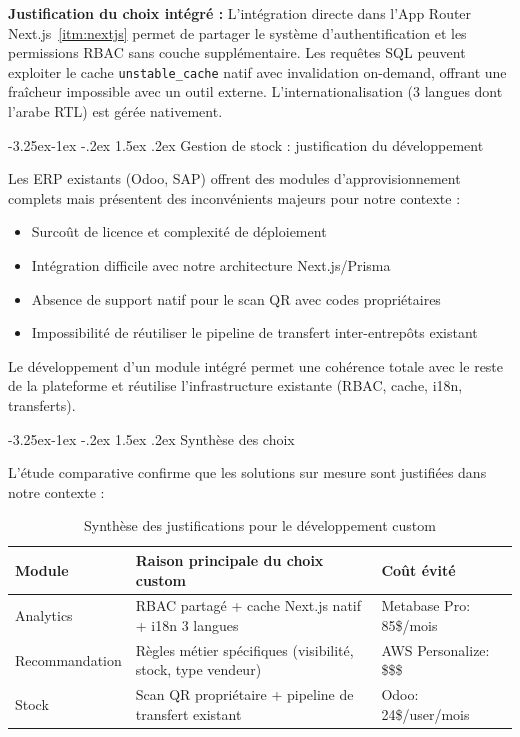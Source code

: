 \documentclass[12pt,a4paper,openany]{report}
\makeatletter
\renewcommand\subsection{\@startsection{subsection}{2}{\z@}%
  {-3.25ex\@plus -1ex \@minus -.2ex}%
  {1.5ex \@plus .2ex}%
  {\needspace{8\baselineskip}\normalfont\large\bfseries\color{primary!80!black}}}
\newcommand{\code}[1]{\texttt{#1}}
\makeatother
\begin{document}
\textbf{Justification du choix intégré :} L'intégration directe dans l'App Router Next.js~\ref{itm:nextjs} permet de partager le système d'authentification et les permissions RBAC sans couche supplémentaire. Les requêtes SQL peuvent exploiter le cache \code{unstable\_cache} natif avec invalidation on-demand, offrant une fraîcheur impossible avec un outil externe. L'internationalisation (3 langues dont l'arabe RTL) est gérée nativement.

\subsection{Gestion de stock : justification du développement}

Les ERP existants (Odoo, SAP) offrent des modules d'approvisionnement complets mais présentent des inconvénients majeurs pour notre contexte :
\begin{itemize}
  \item Surcoût de licence et complexité de déploiement
  \item Intégration difficile avec notre architecture Next.js/Prisma
  \item Absence de support natif pour le scan QR avec codes propriétaires
  \item Impossibilité de réutiliser le pipeline de transfert inter-entrepôts existant
\end{itemize}

Le développement d'un module intégré permet une cohérence totale avec le reste de la plateforme et réutilise l'infrastructure existante (RBAC, cache, i18n, transferts).

\subsection{Synthèse des choix}

L'étude comparative confirme que les solutions sur mesure sont justifiées dans notre contexte :

\begin{table}[H]
\centering
{}
\begin{tabularx}{\textwidth}{lXl}
\toprule
\rowcolor{headerblue!20}
\textbf{Module} & \textbf{Raison principale du choix custom} & \textbf{Coût évité} \\
\midrule
Analytics & RBAC partagé + cache Next.js natif + i18n 3 langues & Metabase Pro: 85\$/mois \\
Recommandation & Règles métier spécifiques (visibilité, stock, type vendeur) & AWS Personalize: \$\$\$ \\
Stock & Scan QR propriétaire + pipeline de transfert existant & Odoo: 24\$/user/mois \\
\bottomrule
\end{tabularx}
\caption{Synthèse des justifications pour le développement custom}
\end{table}
\end{document}
